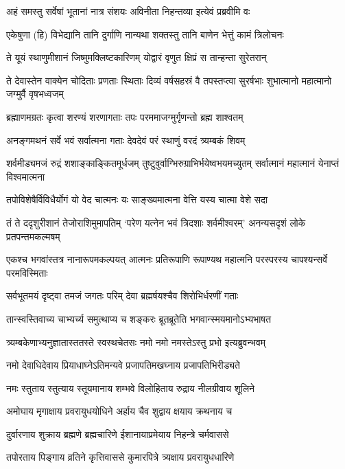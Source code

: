 \twolineshloka
{अहं समस्तु सर्वेषां भूतानां नात्र संशयः}
{अविनीता निहन्तव्या इत्येवं प्रब्रवीमि वः}


\twolineshloka
{एकेषुणा (हि) विभेद्यानि तानि दुर्गाणि नान्यथा}
{शक्तस्तु तानि बाणेन भेत्तुं कामं त्रिलोचनः}


\twolineshloka
{ते यूयं स्थाणुमीशानं जिष्मुमक्लिष्टकारिणम्}
{योद्वारं वृणुत क्षिप्रं स तान्हन्ता सुरेतरान्}


\threelineshloka
{ते देवास्तेन वाक्येन चोदिताः प्रणताः स्थिताः}
{दिव्यं वर्षसहस्रं वै तपस्तप्त्वा सुरर्षभाः}
{शुभात्मानो महात्मानो जग्मुर्वै वृषभध्वजम्}


\twolineshloka
{ब्रह्माणमग्रतः कृत्वा शरण्यं शरणागताः}
{तपः परममाजग्मुर्गृणन्तो ब्रह्म शाश्वतम्}


\twolineshloka
{अनङ्गमथनं सर्वे भवं सर्वात्मना गताः}
{देवदेवं परं स्थाणुं वरदं त्र्यम्बकं शिवम्}


\threelineshloka
{शर्वमीड्यमजं रुद्रं शशाङ्काङ्कितमूर्धजम्}
{तुष्टुवुर्वाग्भिरुग्राभिर्भयेष्वभयमच्युतम्}
{सर्वात्मानं महात्मानं येनाप्तं विश्वमात्मना}


\twolineshloka
{तपोविशेषैर्विविधैर्योगं यो वेद चात्मनः}
{यः साङ्ख्यमात्मना वेत्ति यस्य चात्मा वेशे सदा}


\threelineshloka
{तं ते ददृशुरीशानं तेजोराशिमुमापतिम्}
{`परेण यत्नेन भवं त्रिदशाः शर्वमीश्वरम्'}
{अनन्यसदृशं लोके प्रतपन्तमकल्मषम्}


\threelineshloka
{एकश्च भगवांस्तत्र नानारूपमकल्पयत्}
{आत्मनः प्रतिरूपाणि रूपाण्यथ महात्मनि}
{परस्परस्य चापश्यन्सर्वे परमविस्मिताः}


\twolineshloka
{सर्वभूतमयं दृष्ट्वा तमजं जगतः परिम्}
{देवा ब्रह्मर्षयश्चैव शिरोभिर्धरणीं गताः}


\twolineshloka
{तान्स्वस्तिवाच्य चाभ्यर्च्य समुत्थाप्य च शङ्करः}
{ब्रूतब्रूतेति भगवान्स्मयमानोऽभ्यभाषत}


\twolineshloka
{त्र्यम्बकेणाभ्यनुज्ञातास्ततस्ते स्वस्थचेतसः}
{नमो नमो नमस्तेऽस्तु प्रभो इत्यब्रुवन्भवम्}


\twolineshloka
{नमो देवाधिदेवाय प्रियाधाघ्नेऽतिमन्यवे}
{प्रजापतिमखघ्नाय प्रजापतिभिरीड्यते}


\twolineshloka
{नमः स्तुताय स्तुत्याय स्तूयमानाय शम्भवे}
{विलोहिताय रुद्राय नीलग्रीवाय शूलिने}


\twolineshloka
{अमोघाय मृगाक्षाय प्रवरायुधयोधिने}
{अर्हाय चैव शुद्वाय क्षयाय क्रथनाय च}


\twolineshloka
{दुर्वारणाय शुक्राय ब्रह्मणे ब्रह्मचारिणे}
{ईशानायाप्रमेयाय निहन्त्रे चर्मवाससे}


\twolineshloka
{तपोरताय पिङ्गाय व्रतिने कृत्तिवाससे}
{कुमारपित्रे त्र्यक्षाय प्रवरायुधधारिणे}


